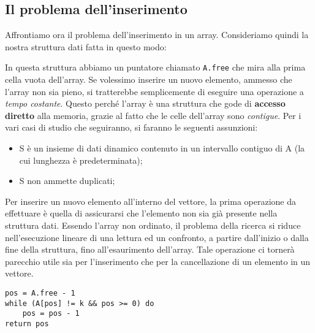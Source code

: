 \subsection{Il problema dell'inserimento}
Affrontiamo ora il problema dell'inserimento in un array. Consideriamo quindi la nostra struttura dati fatta in questo modo:
\begin{center}
\end{center}

In questa struttura abbiamo un puntatore chiamato \texttt{A.free} che mira alla prima cella vuota dell'array. Se volessimo inserire un nuovo elemento, ammesso che l'array non sia pieno, si tratterebbe semplicemente di eseguire una operazione a \textit{tempo costante}. Questo perché l'array è una struttura che gode di \textbf{accesso diretto} alla memoria, grazie al fatto che le celle dell'array sono \textit{contigue}. Per i vari casi di studio che seguiranno, si faranno le seguenti assunzioni:

\begin{itemize}
    \item S è un insieme di dati dinamico contenuto in un intervallo contiguo di A (la cui lunghezza è predeterminata);
    \item S non ammette duplicati;
\end{itemize}

Per inserire un nuovo elemento all'interno del vettore, la prima operazione da effettuare è quella di assicurarsi che l'elemento non sia già presente nella struttura dati. Essendo l'array non ordinato, il problema della ricerca si riduce nell'esecuzione lineare di una lettura ed un confronto, a partire dall'inizio o dalla fine della struttura, fino all'esaurimento dell'array. Tale operazione ci tornerà parecchio utile sia per l'inserimento che per la cancellazione di un elemento in un vettore.

\begin{lstlisting}[label = lst:SearchInArray, language=asd, caption={Search(A,k)}]
pos = A.free - 1
while (A[pos] != k && pos >= 0) do
	pos = pos - 1
return pos
\end{lstlisting}

